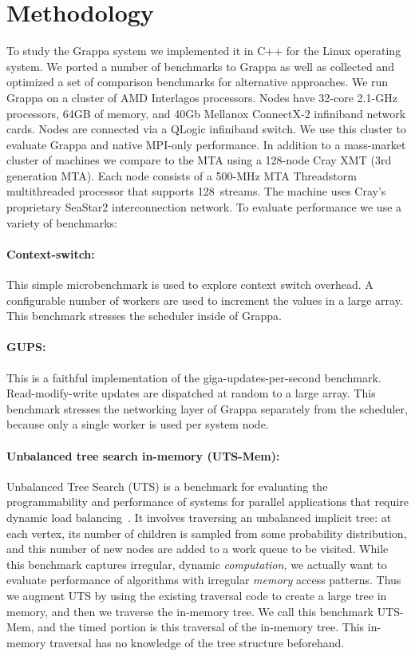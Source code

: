 \section{Methodology} \label{sec:method}

To study the Grappa system we implemented it in C++ for the Linux operating system.  We ported a number of benchmarks to Grappa as well as collected and optimized a set of comparison benchmarks for alternative approaches.  We run Grappa on a cluster of AMD Interlagos processors. Nodes have 32-core 2.1-GHz processors, 64GB of memory, and 40Gb Mellanox ConnectX-2 infiniband network cards.  Nodes are connected via a QLogic infiniband switch.  We use this cluster to evaluate Grappa and native MPI-only performance.  In addition to a mass-market cluster of machines we compare to the MTA using a 128-node Cray XMT (3rd generation MTA). Each node consists of a 500-MHz MTA Threadstorm multithreaded processor that supports 128~streams. The machine uses Cray's proprietary SeaStar2 interconnection network.  To evaluate performance we use a variety of benchmarks:

\paragraph{Context-switch:} This simple microbenchmark is used to explore context switch overhead.  A configurable number of workers are used to increment the values in a large array.  This benchmark stresses the scheduler inside of Grappa.

\paragraph{GUPS:} This is a faithful implementation of the giga-updates-per-second benchmark.  Read-modify-write updates are dispatched at random to a large array.  This benchmark stresses the networking layer of Grappa separately from the scheduler, because only a single worker is used per system node.

\paragraph{Unbalanced tree search in-memory (UTS-Mem):} Unbalanced Tree Search (UTS) is a benchmark for evaluating the programmability and performance of systems for parallel applications that require dynamic load balancing~\cite{UTS}. It involves traversing an unbalanced implicit tree: at each vertex, its number of children is sampled from some probability distribution, and this number of new nodes are added to a work queue to be visited. While this benchmark captures irregular, dynamic \emph{computation,} we actually want to evaluate performance of algorithms with irregular \emph{memory\/} access patterns. Thus we augment UTS by using the existing traversal code to create a large tree in memory, and then we traverse the in-memory tree. We call this benchmark UTS-Mem, and the timed portion is this traversal of the in-memory tree. This in-memory traversal has no knowledge of the tree structure beforehand.

